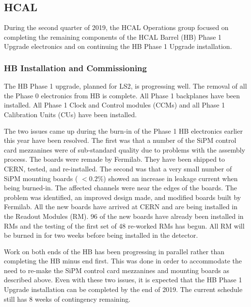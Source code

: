 \documentclass[12pt]{article}
\begin{document}
\subsection{HCAL}

During the second quarter of 2019, the HCAL Operations group focused on completing
the remaining components of the HCAL Barrel (HB)  Phase 1 Upgrade electronics and on
continuing the HB Phase 1 Upgrade installation.

\subsubsection{HB Installation and Commissioning}

The HB Phase 1 upgrade, 
planned for LS2, is progressing well.
The removal of all the Phase 0 electronics from HB is complete. 
All Phase 1 backplanes have been installed.
All Phase 1 Clock and Control modules (CCMs) and  all Phase 1 Calibration Units (CUs) have been 
installed.

The two issues came up during the burn-in 
of the Phase 1 HB electronics earlier this year have been resolved.
The first was that a number of the SiPM control card mezzanines were of sub-standard quality
due to problems with the assembly process. The boards were remade by Fermilab. They have been shipped
to CERN, tested, and re-installed. 
The second was that a very small number of SiPM mounting boards ( $< 0.2\%$) showed an increase in leakage current 
when being burned-in. The affected channels were near the edges of the boards. The problem was
identified, an improved design made, and modified boards built by Fermilab. 
 All the new boards have arrived at CERN and are being installed in the Readout Modules (RM). 96 of the new boards have already been installed in RMs and the testing of
 the first set of 48 re-worked RMs has begun. All RM will be burned in for two weeks before 
 being installed in the detector.

  
 Work on both ends
 of the HB has been progressing in parallel rather than completing
 the HB minus end first. This was done in order to accommodate the need
 to re-make the SiPM control card mezzanines and mounting boards
 as described above.  Even with these two issues, it is expected that the HB Phase 1 Upgrade installation
 can be completed by the end of 2019.  The current schedule still has 8 weeks of contingency remaining.\\

\end{document}
